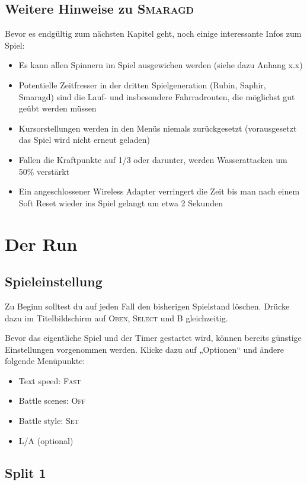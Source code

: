 \documentclass[11pt,a4paper,titlepage]{article}
\begin{document}
{{{{\subsection{Weitere Hinweise zu \textsc{Smaragd}}
\label{sec:additional_infos}
Bevor es endgültig zum nächsten Kapitel geht, noch einige interessante Infos zum Spiel:
\begin{itemize}
\item Es kann allen Spinnern im Spiel ausgewichen werden (siehe dazu Anhang x.x)
\item Potentielle Zeitfresser in der dritten Spielgeneration (Rubin, Saphir, Smaragd) sind die Lauf- und insbesondere Fahrradrouten, die möglichst gut geübt werden müssen
\item Kursorstellungen werden in den Menüs niemals zurückgesetzt (vorausgesetzt das Spiel wird nicht erneut geladen)
\item Fallen die Kraftpunkte auf 1/3 oder darunter, werden Wasserattacken um 50\% verstärkt
\item Ein angeschlossener Wireless Adapter verringert die Zeit bis man nach einem Soft Reset wieder ins Spiel gelangt um etwa 2 Sekunden
\end{itemize}
}



\section{Der Run}{
\subsection{Spieleinstellung}
Zu Beginn solltest du auf jeden Fall den bisherigen Spielstand löschen. Drücke dazu im Titelbildschirm auf \textsc{Oben}, \textsc{Select} und \textsc{B} gleichzeitig.

Bevor das eigentliche Spiel und der Timer gestartet wird, können bereits günstige Einstellungen vorgenommen werden. Klicke dazu auf „Optionen“ und ändere folgende Menüpunkte:
\begin{itemize}
\item Text speed: \textsc{Fast}
\item Battle scenes: \textsc{Off}
\item Battle style: \textsc{Set}
\item L/A (optional)
\end{itemize}
}

\subsection{Split 1}
}}}
\end{document}
